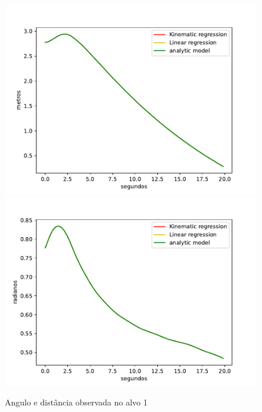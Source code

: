 \begin{figure}[H]
    \centering
    \includegraphics[scale=0.3]{figuras/distance_over_time_1.pdf}
    \hspace{1cm}
    \includegraphics[scale=0.3]{figuras/angle_over_time_1.pdf}
    \caption{Angulo e distância observada no alvo 1}
\end{figure}

